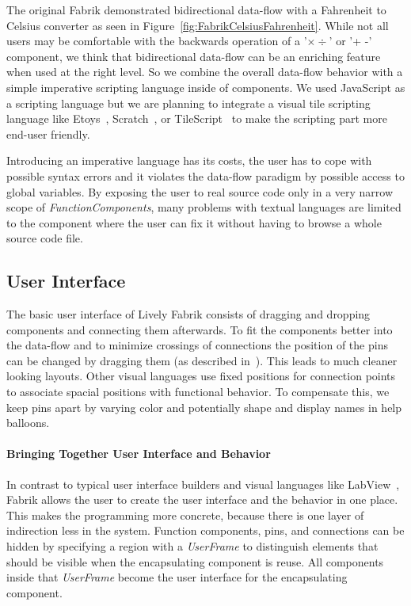 \documentclass[pdftex, times, 10pt, twocolumn]{article}
\begin{document}
The original Fabrik demonstrated bidirectional data-flow with a Fahrenheit to Celsius converter as seen in Figure~\ref{fig:FabrikCelsiusFahrenheit}. While not all users may be comfortable with the backwards operation of a  '$\times \div$' or '+ -' component, we think that bidirectional data-flow can be an enriching feature when used at the right level. So we combine the overall data-flow behavior with a simple imperative scripting language inside of components.  We used JavaScript as a scripting language but we are planning to integrate a visual tile scripting language like Etoys~\cite{Kay2005SEA}, Scratch~\cite{Maloney2004SSP}, or TileScript~\cite{Warth2008TMS} to make the scripting part more end-user friendly.  

Introducing an imperative language has its costs, the user has to cope with possible syntax errors and it violates the data-flow paradigm by possible access to global variables.  By exposing the user to real source code only in a very narrow scope of {\em FunctionComponents}, many problems with textual languages are limited to  the component where the user can fix it without having to browse a whole source code file.  



\subsection{User Interface}
The basic user interface of Lively Fabrik consists of dragging and dropping components and connecting them afterwards. To fit the components better into the data-flow and to minimize crossings of connections the position of the pins can be changed by dragging them (as described in~\cite{Ludolph1988FPE}). This leads to much cleaner looking layouts. Other visual languages use fixed positions for connection points to associate spacial positions with functional behavior. To compensate this, we keep pins apart by varying  color and potentially shape and display names in help balloons.  



\paragraph{Bringing Together User Interface and Behavior}
In contrast to typical user interface builders and visual languages like LabView~\cite{Bitter2006LAP}, Fabrik allows the user to create the user interface and the behavior in one place. This makes the programming more concrete, because there is one layer of indirection less in the system. Function components, pins, and connections can be hidden by specifying a region with a {\em UserFrame} to distinguish elements that should be visible when the encapsulating component is reuse. All components inside that {\em UserFrame} become the user interface for the encapsulating component.  
\end{document}

